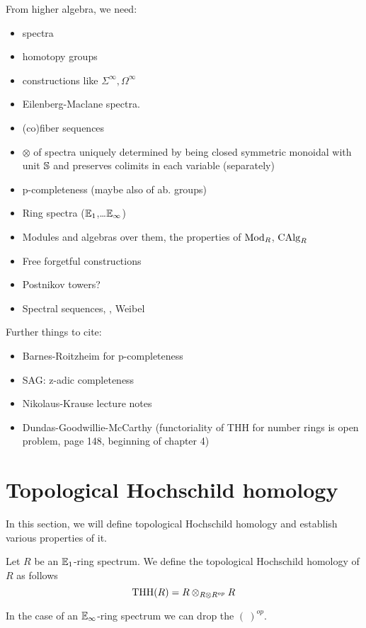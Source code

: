 From higher algebra, we need:
\begin{itemize}
    \item spectra
    \item homotopy groups
    \item constructions like $\Sigma^\infty,\Omega^\infty$ 
    \item Eilenberg-Maclane spectra.
    \item (co)fiber sequences
    \item $\otimes$ of spectra uniquely determined by being closed symmetric monoidal with unit $\S$ and preserves colimits in each variable (separately)
    \item p-completeness (maybe also of ab. groups)
    \item Ring spectra ($\Eone$,\dots $\Einf$)
    \item Modules and algebras over them, the properties of $\Mod_R$, $\CAlg_R$
    \item Free forgetful constructions
    \item Postnikov towers?
    \item Spectral sequences, \cite[Section~1.2.2]{lurie2017higher}, Weibel \cite[Chapter~5]{weibel1994introduction}
\end{itemize}
Further things to cite:
\begin{itemize}
    \item Barnes-Roitzheim for p-completeness \cite[Section~8.4.1]{barnesroitzheimfoundation}
    \item SAG: z-adic completeness \cite[Section~7.3]{SAG}
    
    \item Nikolaus-Krause lecture notes 
    \item Dundas-Goodwillie-McCarthy (functoriality of THH for number rings is open problem, page 148, beginning of chapter 4)
    \cite[148]{DundasGoodwillieMccarthyLocalstructure}
\end{itemize}




\section{Topological Hochschild homology}
In this section, we will define topological Hochschild homology and establish various properties of it.

\begin{defn}
    Let $R$ be an $\Eone$-ring spectrum.
    We define the topological Hochschild homology of $R$ as follows
    \begin{equation*}
        \THH(R)=R\otimes_{R\otimes R^{op}}R
    \end{equation*}
    \end{defn}
    In the case of an $\Einf$-ring spectrum we can drop the $(\:)^{op}$. 

